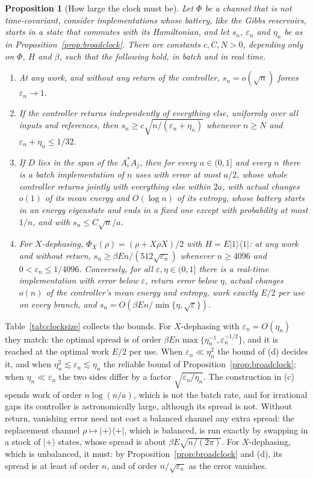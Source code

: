 \documentclass[11pt]{article}
\newtheorem{proposition}[theorem]{Proposition}
\theoremstyle{definition}
\theoremstyle{remark}
\begin{document}
\begin{proposition}[How large the clock must be]\label{prop:clocksize}
Let $\Phi$ be a channel that is not time-covariant, consider implementations whose battery, like the Gibbs reservoirs, starts in a state that commutes with its Hamiltonian, and let $s_n$, $\varepsilon_n$ and $\eta_n$ be as in Proposition~\ref{prop:broadclock}. There are constants $c,C,N>0$, depending only on $\Phi$, $H$ and $\beta$, such that the following hold, in batch and in real time.
\begin{enumerate}[label=(\alph*)]
\item At any work, and without any return of the controller, $s_n=o(\sqrt n)$ forces $\varepsilon_n\to1$.
\item If the controller returns independently of everything else, uniformly over all inputs and references, then $s_n\ge c\sqrt{n/(\varepsilon_n+\eta_n)}$ whenever $n\ge N$ and $\varepsilon_n+\eta_n\le1/32$.
\item If $D$ lies in the span of the $A_i^*A_j$, then for every $a\in(0,1]$ and every $n$ there is a batch implementation of $n$ uses with error at most $a/2$, whose whole controller returns jointly with everything else within $2a$, with actual changes $o(1)$ of its mean energy and $O(\log n)$ of its entropy, whose battery starts in an energy eigenstate and ends in a fixed one except with probability at most $1/n$, and with $s_n\le C\sqrt n/a$.
\item For $X$-dephasing, $\Phi_X(\rho)=(\rho+X\rho X)/2$ with $H=E|1\rangle\langle1|$: at any work and without return, $s_n\ge\beta En/(512\sqrt{\varepsilon_n})$ whenever $n\ge4096$ and $0<\varepsilon_n\le1/4096$. Conversely, for all $\varepsilon,\eta\in(0,1]$ there is a real-time implementation with error below $\varepsilon$, return error below $\eta$, actual changes $o(n)$ of the controller's mean energy and entropy, work exactly $E/2$ per use on every branch, and $s_n=O(\beta En/\min\{\eta,\sqrt\varepsilon\})$.
\end{enumerate}
\end{proposition}

Table~\ref{tab:clocksize} collects the bounds. For $X$-dephasing with $\varepsilon_n=O(\eta_n)$ they match: the optimal spread is of order $\beta En\max\{\eta_n^{-1},\varepsilon_n^{-1/2}\}$, and it is reached at the optimal work $E/2$ per use. When $\varepsilon_n\ll\eta_n^2$ the bound of (d) decides it, and when $\eta_n^2\lesssim\varepsilon_n\lesssim\eta_n$ the reliable bound of Proposition~\ref{prop:broadclock}; when $\eta_n\ll\varepsilon_n$ the two sides differ by a factor $\sqrt{\varepsilon_n/\eta_n}$. The construction in (c) spends work of order $n\log(n/a)$, which is not the batch rate, and for irrational gaps its controller is astronomically large, although its spread is not. Without return, vanishing error need not cost a balanced channel any extra spread: the replacement channel $\rho\mapsto|+\rangle\langle+|$, which is balanced, is run exactly by swapping in a stock of $|+\rangle$ states, whose spread is about $\beta E\sqrt{n/(2\pi)}$. For $X$-dephasing, which is unbalanced, it must: by Proposition~\ref{prop:broadclock} and (d), its spread is at least of order $n$, and of order $n/\sqrt{\varepsilon_n}$ as the error vanishes.
\end{document}
